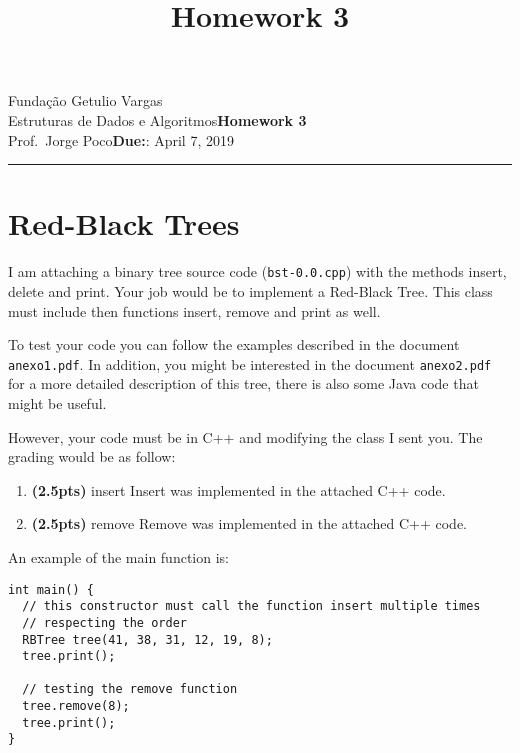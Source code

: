 \documentclass{article}
\title{Homework 3}
\date{}
\newcommand{\assignment}{Homework 3}
\newcommand{\duedate}{April 7, 2019}
\begin{document}
Fundação Getulio Vargas\hfill\\
Estruturas de Dados e Algoritmos\hfill\textbf{\assignment}\\
Prof.\ Jorge Poco\hfill\textbf{Due:}: \duedate\\
\smallskip\hrule\bigskip

{\let\newpage\relax\maketitle}
\maketitle


\section{Red-Black Trees}

I am attaching a binary tree source code (\texttt{bst-0.0.cpp}) with the methods insert, delete and print. Your job would be to implement a Red-Black Tree. This class must include then functions insert, remove and print as well. 

To test your code you can follow the examples described in the document \texttt{anexo1.pdf}. In addition, you might be interested in the document \texttt{anexo2.pdf} for a more detailed description of this tree, there is also some Java code that might be useful. 

However, your code must be in C++ and modifying the class I sent you. The grading would be as follow:

\begin{enumerate}[label=(\alph*)]
  \item \textbf{(2.5pts)} insert
  \bigbreak
  Insert was implemented in the attached C++ code.
  \bigbreak
  \item \textbf{(2.5pts)} remove 
  \bigbreak
  Remove was implemented in the attached C++ code.
  \bigbreak
\end{enumerate}

An example of the main function is: 

\begin{lstlisting}
int main() {
  // this constructor must call the function insert multiple times 
  // respecting the order
  RBTree tree(41, 38, 31, 12, 19, 8);
  tree.print();

  // testing the remove function
  tree.remove(8);
  tree.print();
}
\end{lstlisting}
\end{document}
